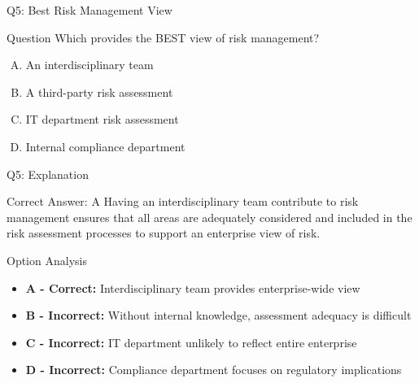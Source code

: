 \documentclass{beamer}
\begin{document}
	\begin{frame}{Q5: Best Risk Management View}
		\begin{block}{Question}
			Which provides the BEST view of risk management?
		\end{block}
		\begin{enumerate}[(A)]
			\item An interdisciplinary team
			\item A third-party risk assessment
			\item IT department risk assessment
			\item Internal compliance department
		\end{enumerate}
	\end{frame}
	
	\begin{frame}{Q5: Explanation}
		\begin{block}{Correct Answer: A}
			Having an interdisciplinary team contribute to risk management ensures that all areas are adequately considered and included in the risk assessment processes to support an enterprise view of risk.
		\end{block}
		\begin{block}{Option Analysis}
			\begin{itemize}
				\item \textbf{A - Correct:} Interdisciplinary team provides enterprise-wide view
				\item \textbf{B - Incorrect:} Without internal knowledge, assessment adequacy is difficult
				\item \textbf{C - Incorrect:} IT department unlikely to reflect entire enterprise
				\item \textbf{D - Incorrect:} Compliance department focuses on regulatory implications
			\end{itemize}
		\end{block}
	\end{frame}
	
	
	
\end{document}
